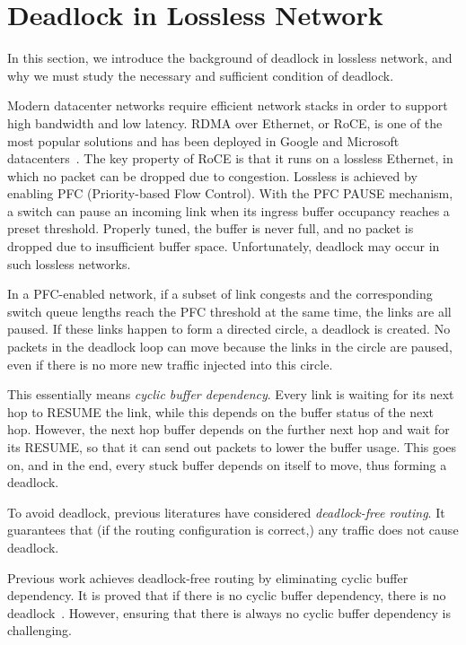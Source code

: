 \secspacelarge
\section{Deadlock in Lossless Network}
\secspace

In this section, we introduce the background of deadlock in lossless network,
and why we must study the necessary and sufficient condition of deadlock.

Modern datacenter networks require efficient network stacks in order to support
high bandwidth and low latency. RDMA over Ethernet, or RoCE, is one of the most
popular solutions and has been deployed in Google and Microsoft
datacenters~\cite{dcqcn, timely}.  The key property of RoCE is that it runs on a
lossless Ethernet, in which no packet can be dropped due to congestion.
Lossless is achieved by enabling PFC (Priority-based Flow Control). With the PFC
PAUSE mechanism, a switch can pause an incoming link when its ingress buffer
occupancy reaches a preset threshold. Properly tuned, the buffer is never full,
and no packet is dropped due to insufficient buffer space.  Unfortunately,
deadlock may occur in such lossless networks.

In a PFC-enabled network, if a subset of link congests and the corresponding
switch queue lengths reach the PFC threshold at the same time, the links are all
paused. If these links happen to form a directed circle, a deadlock is created.
No packets in the deadlock loop can move because the links in the circle are
paused, even if there is no more new traffic injected into this circle.

This essentially means {\em cyclic buffer dependency}. Every link is waiting for
its next hop to RESUME the link, while this depends on the buffer status of the
next hop. However, the next hop buffer depends on the further next hop and wait
for its RESUME, so that it can send out packets to lower the buffer usage. This
goes on, and in the end, every stuck buffer depends on itself to move, thus
forming a deadlock.

To avoid deadlock, previous literatures have considered {\em deadlock-free
routing}. It guarantees that (if the routing configuration is correct,) any
traffic does not cause deadlock.

 Previous work achieves deadlock-free routing by eliminating
cyclic buffer dependency.  It is proved that if there is no cyclic buffer
dependency, there is no deadlock~\cite{deadlockfree}.  However, ensuring that
there is always no cyclic buffer dependency is challenging.

